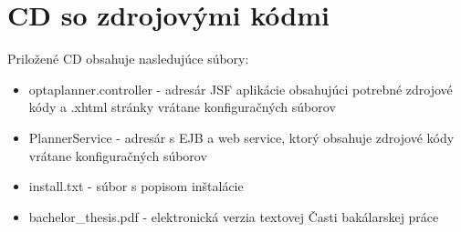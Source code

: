 \chapter{CD so zdrojovými kódmi}
{
	Priložené CD obsahuje nasledujúce súbory:
	\begin{itemize}
	\item optaplanner.controller - adresár JSF aplikácie obsahujúci potrebné zdrojové kódy a .xhtml stránky vrátane konfiguračných súborov
	\item PlannerService - adresár s EJB a web service, ktorý obsahuje zdrojové kódy vrátane konfiguračných súborov
	\item install.txt - súbor s popisom inštalácie
	\item bachelor_thesis.pdf - elektronická verzia textovej Časti bakálarskej práce
	\end{itemize}
}

